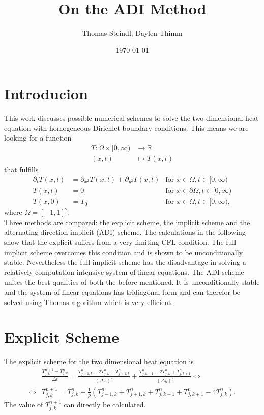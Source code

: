 \documentclass[a4aper,pagesize]{article}
\title{On the ADI Method}
\date{\today}
\author{Thomas Steindl, Daylen Thimm}
\theoremstyle{definition}
\theoremstyle{plain}
\theoremstyle{remark}
\newcommand{\RR}{\mathbb{R}}
\begin{document}
\maketitle

\section*{Introducion}
This work discusses possible numerical schemes to solve the two dimensional heat equation with homogeneous Dirichlet boundary conditions. This means we are looking for a function
\begin{align}
	T: \Omega \times [0,\infty) &\rightarrow \RR\\
	(x,t)  &\mapsto T(x,t)
\end{align} that fulfills
\begin{align}
	\partial_t T(x,t) &= \partial_{x^2} T(x,t) + \partial_{y^2} T(x,t) &\text{for } x\in\Omega, t\in[0,\infty)\\
	T(x,t) &= 0 &\text{for } x\in\partial \Omega, t\in[0,\infty)\\
	T(x, 0) &= T_0 &\text{for } x\in\Omega, t\in[0,\infty),
\end{align}
where $\Omega = [-1,1]^2$.\\

Three methods are compared: the explicit scheme, the implicit scheme and the alternating direction implicit (ADI) scheme. The calculations in the following show that the explicit suffers from a very limiting CFL condition. The full implicit scheme overcomes this condition and is shown to be unconditionally stable. Nevertheless the full implicit scheme has the disadvantage in solving a relatively computation intensive system of linear equations. The ADI scheme unites the best qualities of both the before mentioned. It is unconditionally stable and the system of linear equations has tridiagonal form and can therefor be solved using Thomas algorithm which is very efficient.

\section{Explicit Scheme}
The explicit scheme for the two dimensional heat equation is
\begin{align}
	&\frac{T_{j,k}^{n+1} - T_{j,k}^{n}}{\Delta t}
	= \frac{T_{j-1,k}^{n} - 2 T_{j,k}^{n} + T_{j+1,k}^{n}}{(\Delta x)^2}
	+ \frac{T_{j,k-1}^{n} - 2 T_{j,k}^{n} + T_{j,k+1}^{n}}{(\Delta y)^2}
\Leftrightarrow\\
\Leftrightarrow
	&T_{j,k}^{n+1}
	= T_{j,k}^{n}
	+ \frac{1}{\rho} \left(
		T_{j-1,k}^{n}
		+ T_{j+1,k}^{n}
		+ T_{j,k-1}^{n}
		+ T_{j,k+1}^{n}
		- 4 T_{j,k}^{n}
	\right).
\end{align}
The value of $T_{j,k}^{n+1}$ can directly be calculated.
\end{document}
